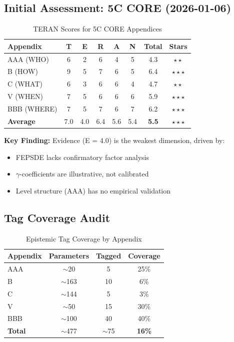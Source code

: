 \documentclass[11pt,a4paper]{article}
\begin{document}
\subsection{Initial Assessment: 5C CORE (2026-01-06)}

\begin{table}[h]
\centering
\caption{TERAN Scores for 5C CORE Appendices}
\label{tab:assessment}
\begin{tabular}{lccccccc}
\toprule
\textbf{Appendix} & \textbf{T} & \textbf{E} & \textbf{R} & \textbf{A} & \textbf{N} & \textbf{Total} & \textbf{Stars} \\
\midrule
AAA (WHO) & 6 & 2 & 6 & 4 & 5 & 4.3 & $\star\star$ \\
B (HOW) & 9 & 5 & 7 & 6 & 5 & 6.4 & $\star\star\star$ \\
C (WHAT) & 6 & 3 & 6 & 6 & 4 & 4.7 & $\star\star$ \\
V (WHEN) & 7 & 5 & 6 & 6 & 6 & 5.9 & $\star\star\star$ \\
BBB (WHERE) & 7 & 5 & 7 & 6 & 7 & 6.2 & $\star\star\star$ \\
\midrule
\textbf{Average} & 7.0 & 4.0 & 6.4 & 5.6 & 5.4 & \textbf{5.5} & $\star\star\star$ \\
\bottomrule
\end{tabular}
\end{table}

\textbf{Key Finding:} Evidence (E = 4.0) is the weakest dimension, driven by:
\begin{itemize}
    \item FEPSDE lacks confirmatory factor analysis
    \item $\gamma$-coefficients are illustrative, not calibrated
    \item Level structure (AAA) has no empirical validation
\end{itemize}

\subsection{Tag Coverage Audit}

\begin{table}[h]
\centering
\caption{Epistemic Tag Coverage by Appendix}
\begin{tabular}{lccc}
\toprule
\textbf{Appendix} & \textbf{Parameters} & \textbf{Tagged} & \textbf{Coverage} \\
\midrule
AAA & $\sim$20 & 5 & 25\% \\
B & $\sim$163 & 10 & 6\% \\
C & $\sim$144 & 5 & 3\% \\
V & $\sim$50 & 15 & 30\% \\
BBB & $\sim$100 & 40 & 40\% \\
\midrule
\textbf{Total} & $\sim$477 & $\sim$75 & \textbf{16\%} \\
\bottomrule
\end{tabular}
\end{table}
\end{document}
